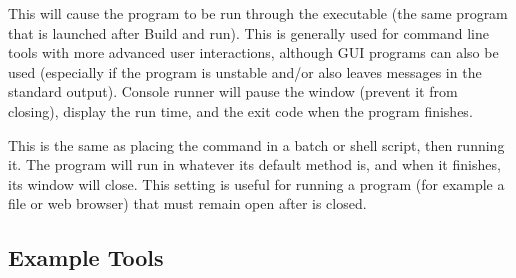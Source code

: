 

This will cause the program to be run through the executable  (the same program that is launched after Build and run). This is generally used for command line tools with more advanced user interactions, although GUI programs can also be used (especially if the program is unstable and/or also leaves messages in the standard output). Console runner will pause the window (prevent it from closing), display the run time, and the exit code when the program finishes.

This is the same as placing the command in a batch or shell script, then running it. The program will run in whatever its default method is, and when it finishes, its window will close. This setting is useful for running a program (for example a file or web browser) that must remain open after \codeblocks is closed.


\subsection{Example Tools}


